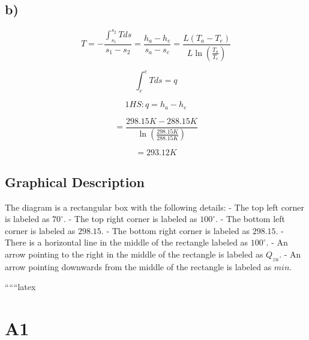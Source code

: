 

\subsection*{b)}

\[
T = - \frac{\int_{s_1}^{s_2} T ds}{s_1 - s_2} = \frac{h_a - h_e}{s_a - s_e} = \frac{L \left( T_a - T_e \right)}{L \ln \left( \frac{T_a}{T_e} \right)}
\]

\[
\int_{e}^{e} T ds = q
\]

\[
1HS: q = h_{a} - h_{e}
\]

\[
= \frac{298.15 K - 288.15 K}{\ln \left( \frac{298.15 K}{288.15 K} \right)}
\]

\[
= 293.12 K
\]

\subsection*{Graphical Description}

The diagram is a rectangular box with the following details:
- The top left corner is labeled as $70^\circ$.
- The top right corner is labeled as $100^\circ$.
- The bottom left corner is labeled as $298.15$.
- The bottom right corner is labeled as $298.15$.
- There is a horizontal line in the middle of the rectangle labeled as $100^\circ$.
- An arrow pointing to the right in the middle of the rectangle is labeled as $Q_{zu}$.
- An arrow pointing downwards from the middle of the rectangle is labeled as $min$.

``````latex


\section*{A1}